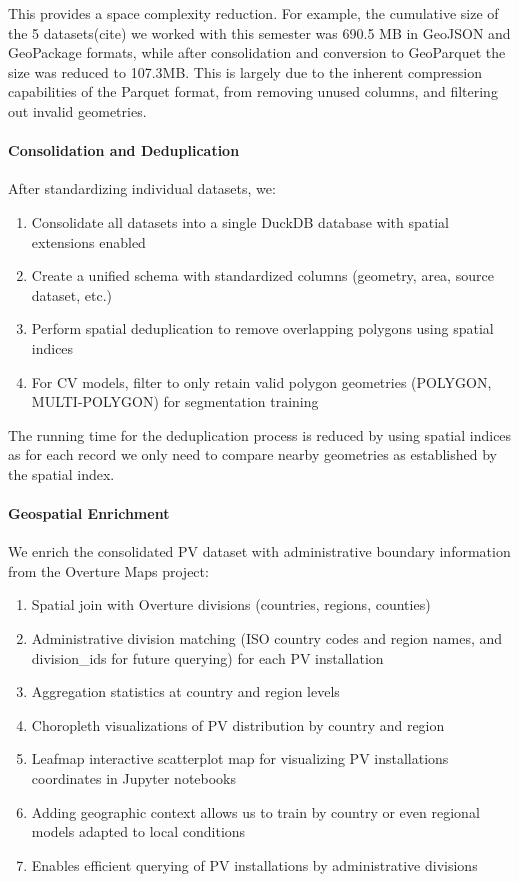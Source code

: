 \begin{multicols}{2}
This provides a space complexity reduction. For example, the cumulative size of the 5 datasets(cite) we worked with this semester was 690.5 MB in GeoJSON and GeoPackage formats, 
while after consolidation and conversion to GeoParquet the size was reduced to 107.3MB. This is largely due to the inherent compression capabilities of the Parquet format, from removing unused columns, 
and filtering out invalid geometries. 

\paragraph{Consolidation and Deduplication}
After standardizing individual datasets, we:
\begin{enumerate}
    \item Consolidate all datasets into a single DuckDB database with spatial extensions enabled
    \item Create a unified schema with standardized columns (geometry, area, source dataset, etc.)
    \item Perform spatial deduplication to remove overlapping polygons using spatial indices
    \item For CV models, filter to only retain valid polygon geometries (POLYGON, MULTI-POLYGON) for segmentation training
\end{enumerate}

The running time for the deduplication process is reduced by using spatial indices as for each record we only need to compare nearby geometries as established by the spatial index.


\paragraph{Geospatial Enrichment}
We enrich the consolidated PV dataset with administrative boundary information from the Overture Maps project:
\begin{enumerate}
    \item Spatial join with Overture divisions (countries, regions, counties)
    \item Administrative division matching (ISO country codes and region names, and division\_ids for future querying) for each PV installation
    \item Aggregation statistics at country and region levels
    \item Choropleth visualizations of PV distribution by country and region
    \item Leafmap interactive scatterplot map for visualizing PV installations coordinates in Jupyter notebooks
    \item Adding geographic context allows us to train by country or even regional models adapted to local conditions
    \item Enables efficient querying of PV installations by administrative divisions
\end{enumerate}


\end{multicols}

